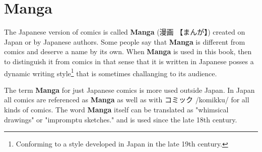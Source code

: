 \section{Manga} 
\label{sec:Manga}

The Japanese version of comics is called \textbf{Manga} ({漫画} {【まんが】})
created on Japan or by Japanese authors. Some people say that \textbf{Manga} is
different from comics and deserve a name by its own. When \textbf{Manga} is
used in this book, then to distinguish it from comics in that sense that it is
written in Japanese posses a dynamic writing style\footnote{Conforming to a
style developed in Japan in the late 19th century.}  that is sometimes
challanging to its audience.

The term \textbf{Manga} for just Japanese comics is more used outside Japan. In
Japan all comics are referenced as \textbf{Manga} as well as with {コミック}
/komikku/ for all kinds of comics. The word \textbf{Manga} itself can be
translated as "whimsical drawings" or "impromptu sketches." and is used since
the late 18th century.


